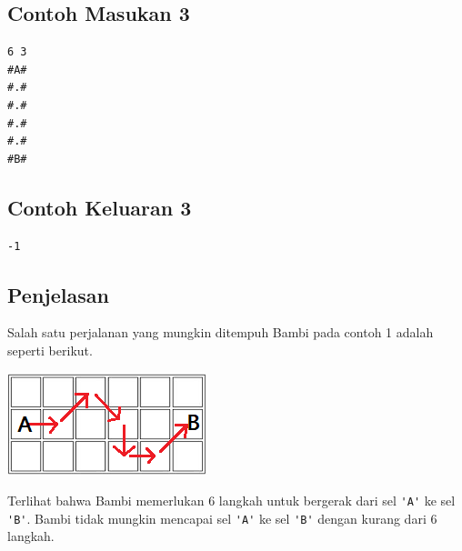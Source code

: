 \documentclass{article}
\begin{document}
\begin{multicols}{2}
\subsection*{Contoh Masukan 3}
\begin{lstlisting}
6 3
#A#
#.#
#.#
#.#
#.#
#B#
\end{lstlisting}
\columnbreak
\subsection*{Contoh Keluaran 3}
\begin{lstlisting}
-1
\end{lstlisting}
\vfill
\null
\end{multicols}

\subsection*{Penjelasan}
Salah satu perjalanan yang mungkin ditempuh Bambi pada contoh 1 adalah seperti berikut.
\begin{center}
    \includegraphics[]{grid-1.png}
\end{center}
Terlihat bahwa Bambi memerlukan $6$ langkah untuk bergerak dari sel \verb|'A'| ke sel \verb|'B'|. Bambi tidak mungkin mencapai sel \verb|'A'| ke sel \verb|'B'| dengan kurang dari $6$ langkah.
\end{document}
